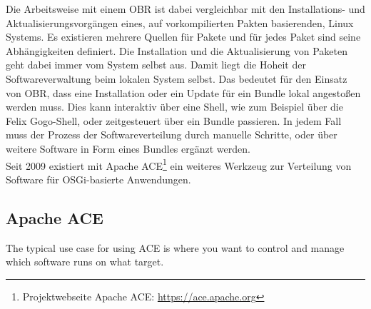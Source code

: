 Die Arbeitsweise mit einem \ac{OBR} ist dabei vergleichbar mit den Installations- und Aktualisierungsvorgängen eines,
auf vorkompilierten Pakten basierenden, Linux Systems.
Es existieren mehrere Quellen für Pakete und für jedes Paket sind seine Abhängigkeiten definiert.
Die Installation und die Aktualisierung von Paketen geht dabei immer vom System selbst aus. 
Damit liegt die Hoheit der Softwareverwaltung beim lokalen System selbst. Das bedeutet für den Einsatz von \ac{OBR}, dass eine Installation oder ein Update für ein Bundle 
lokal angestoßen werden muss. Dies kann interaktiv über eine Shell, wie zum Beispiel über die Felix Gogo-Shell, oder zeitgesteuert über ein Bundle passieren.
In jedem Fall muss der Prozess der Softwareverteilung durch manuelle Schritte, oder über weitere Software in Form eines Bundles ergänzt werden.\\

Seit 2009 existiert mit Apache ACE\footnote{Projektwebseite Apache ACE: \url{https://ace.apache.org}} ein weiteres Werkzeug zur Verteilung von Software für \ac{OSGi}-basierte Anwendungen.

\subsection{Apache ACE}
\glqq The typical use case for using ACE is where you want to control and manage which software runs on what target. \grqq\ \cite{ace}\\

